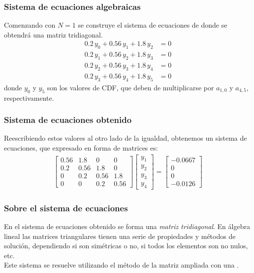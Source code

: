 \begin{frame}
\frametitle{Sistema de ecuaciones algebraicas}
Comenzando con $N = 1$ se construye el sistema de ecuaciones de donde se obtendrá una matriz tridiagonal.
\begin{align}
0.2 \, y_{0} + 0.56 \, y_{1} + 1.8 \, y_{2} &= 0 \label{eq:ecuacion_24} \\[0.25em]
0.2 \, y_{1} + 0.56 \, y_{2} + 1.8 \, y_{3} &= 0 \label{eq:ecuacion_25} \\[0.25em]
0.2 \, y_{2} + 0.56 \, y_{3} + 1.8 \, y_{4} &= 0 \label{eq:ecuacion_26} \\[0.25em]
0.2 \, y_{3} + 0.56 \, y_{4} + 1.8 \, y_{5} &= 0 \label{eq:ecuacion_27}
\end{align}
\fontsize{12}{12}\selectfont
donde $y_{0}$ y $y_{5}$ son los valores de CDF, que deben de multiplicarse por $a_{1,0}$ y $a_{4,5}$, respectivamente.
\end{frame}
\begin{frame}
\frametitle{Sistema de ecuaciones obtenido}
Reescribiendo estos valores al otro lado de la igualdad, obtenemos un sistema de ecuaciones, que expresado en forma de matrices es:
\begin{align*}
\begin{bmatrix}
0.56 & 1.8 & 0 & 0 \\
0.2 & 0.56 & 1.8 & 0 \\
0 & 0.2 & 0.56 & 1.8 \\
0 & 0 & 0.2 & 0.56
\end{bmatrix}
\begin{bmatrix}
y_{1} \\
y_{2} \\
y_{3} \\
y_{4}
\end{bmatrix} =
\begin{bmatrix}
-0.0667 \\
0 \\
0 \\
-0.0126
\end{bmatrix}
\end{align*}
\end{frame}
\begin{frame}
\frametitle{Sobre el sistema de ecuaciones}
En el sistema de ecuaciones obtenido se forma una \emph{matriz tridiagonal}. En álgebra lineal las matrices triangulares tienen una serie de propiedades y métodos de solución, dependiendo si son simétricas o no, si todos los elementos son no nulos, etc.
\\
\bigskip
Este sistema se resuelve utilizando el método de la matriz ampliada con una .
\end{frame}
